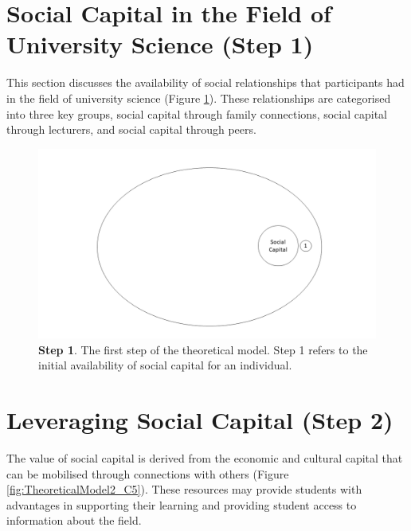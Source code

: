 \section{Social Capital in the Field of University Science (Step 1)}
This section discusses the availability of social relationships that participants had in the field of university science (Figure \ref{fig:TheoreticalModel1_C5}). These relationships are categorised into three key groups, social capital through family connections, social capital through lecturers, and social capital through peers. 

\begin{figure}[h!]
\centering
\includegraphics[width=\textwidth]{C5 - Understanding Capital Accumulation/HabitusSocCap_TheoreticalModel1.png}
\caption{\label{fig:TheoreticalModel1_C5}\textbf{Step 1}. The first step of the theoretical model. Step 1 refers to the initial availability of social capital for an individual.}
\end{figure}



\section{Leveraging Social Capital (Step 2)}
The value of social capital is derived from the economic and cultural capital that can be mobilised through connections with others (Figure \ref{fig:TheoreticalModel2_C5}). These resources may provide students with advantages in supporting their learning and providing student access to information about the field. 


